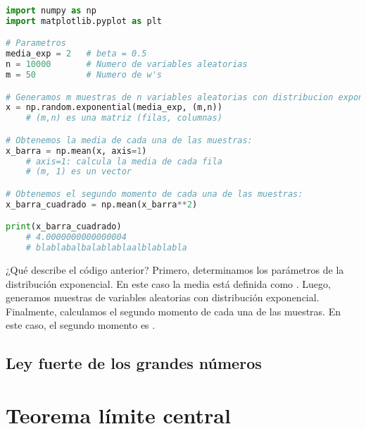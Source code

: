 \documentclass[8pt]{article}
\newcommand{\code}[1]{\texttt{\color{frenchplum}{#1}}}
\begin{document}
\vspace*{0.3cm}

\begin{lstlisting}[language=Python]
import numpy as np
import matplotlib.pyplot as plt

# Parametros
media_exp = 2   # beta = 0.5
n = 10000       # Numero de variables aleatorias
m = 50          # Numero de w's

# Generamos m muestras de n variables aleatorias con distribucion exponencial:
x = np.random.exponential(media_exp, (m,n))
    # (m,n) es una matriz (filas, columnas)

# Obtenemos la media de cada una de las muestras:
x_barra = np.mean(x, axis=1)
    # axis=1: calcula la media de cada fila
    # (m, 1) es un vector

# Obtenemos el segundo momento de cada una de las muestras:
x_barra_cuadrado = np.mean(x_barra**2)

print(x_barra_cuadrado)
    # 4.0000000000000004
    # blablabalbalablablaalblablabla
\end{lstlisting}

\vspace*{0.3cm}

¿Qué describe el código anterior? Primero, determinamos los parámetros de la distribución exponencial. En este caso la media está definida como \code{media\_exp = 2}. Luego, generamos \code{m} muestras de \code{n} variables aleatorias con distribución exponencial. Finalmente, calculamos el segundo momento de cada una de las muestras. En este caso, el segundo momento es \code{4.0000000000000004}.





\subsection{Ley fuerte de los grandes números}




\section{Teorema límite central}
\end{document}
